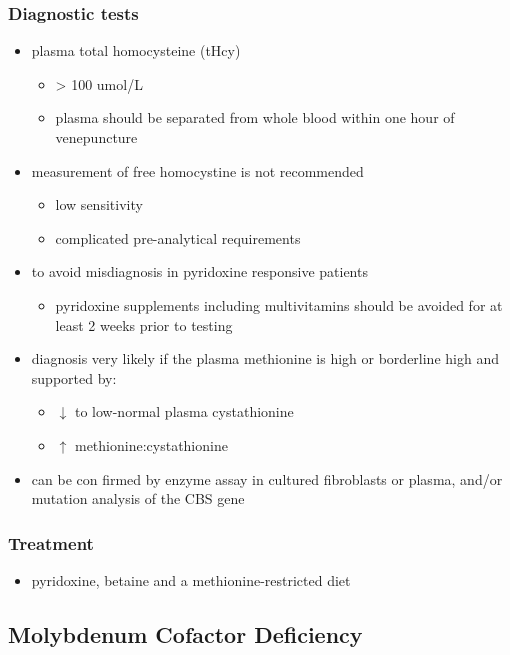 \documentclass{scrartcl}
\begin{document}
\subsubsection{Diagnostic tests}
\label{sec:org736f72d}
\begin{itemize}
\item plasma total homocysteine (tHcy)
\begin{itemize}
\item \textgreater{} 100 umol/L
\item plasma should be separated from whole blood within one hour of venepuncture
\end{itemize}
\item measurement of free homocystine is not recommended
\begin{itemize}
\item low sensitivity
\item complicated pre-analytical requirements
\end{itemize}
\item to avoid misdiagnosis in pyridoxine responsive patients
\begin{itemize}
\item pyridoxine supplements including multivitamins should be avoided
for at least 2 weeks prior to testing
\end{itemize}
\item diagnosis very likely if the plasma methionine is high or borderline
high and supported by:
\begin{itemize}
\item \(\downarrow\) to low-normal plasma cystathionine
\item \(\uparrow\) methionine:cystathionine
\end{itemize}
\item can be con firmed by enzyme assay in cultured fibroblasts or plasma,
and/or mutation analysis of the CBS gene
\end{itemize}

\subsubsection{Treatment}
\label{sec:org1668d8e}
\begin{itemize}
\item pyridoxine, betaine and a methionine-restricted diet
\end{itemize}

\subsection{Molybdenum Cofactor Deficiency}
\label{sec:orgdf2abc3}
\end{document}
